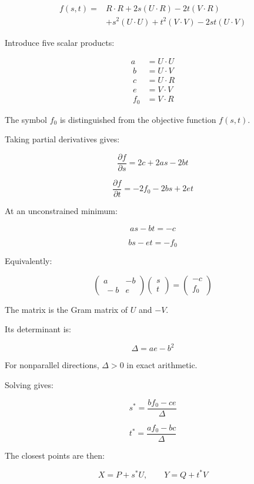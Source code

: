 \[
\begin{aligned} f(s,t) ={}&R\cdot R+2s(U\cdot R)-2t(V\cdot R)\\\ &+s^2(U\cdot U)+t^2(V\cdot V)-2st(U\cdot V) \end{aligned}
\]

Introduce five scalar products:

\[
\begin{aligned} a&=U\cdot U\\\ b&=U\cdot V\\\ c&=U\cdot R\\\ e&=V\cdot V\\\ f_0&=V\cdot R \end{aligned}
\]

The symbol \(f_0\) is distinguished from the objective function \(f(s,t)\).

Taking partial derivatives gives:

\[
\frac{\partial f}{\partial s} = 2c+2as-2bt
\]

\[
\frac{\partial f}{\partial t} = -2f_0-2bs+2et
\]

At an unconstrained minimum:

\[
as-bt=-c
\]

\[
bs-et=-f_0
\]

Equivalently:

\[
\boxed{ \begin{pmatrix} a&-b\\\ -b&e \end{pmatrix} \begin{pmatrix}s\\t\end{pmatrix} = \begin{pmatrix}-c\\f_0\end{pmatrix} }
\]

The matrix is the Gram matrix of \(U\) and \(-V\).

Its determinant is:

\[
\boxed{\Delta=ae-b^2}
\]

For nonparallel directions, \(\Delta>0\) in exact arithmetic.

Solving gives:

\[
\boxed{ s^*=\frac{bf_0-ce}{\Delta} }
\]

\[
\boxed{ t^*=\frac{af_0-bc}{\Delta} }
\]

The closest points are then:

\[
\boxed{ X=P+s^*U,\qquad Y=Q+t^*V }
\]

